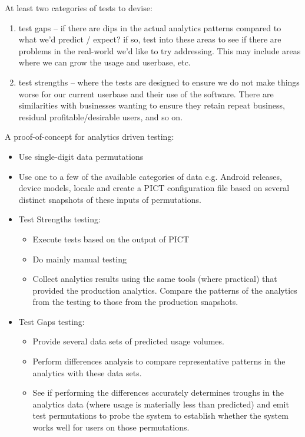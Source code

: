 At least two categories of tests to devise:
\begin{enumerate}
    \item test gaps – if there are dips in the actual analytics patterns compared to what we’d predict / expect? if so, test into these areas to see if there are problems in the real-world we’d like to try addressing. This may include areas where we can grow the usage and userbase, etc.
    \item test strengths – where the tests are designed to ensure we do not make things worse for our current userbase and their use of the software. There are similarities with businesses wanting to ensure they retain repeat business, residual profitable/desirable users, and so on.
\end{enumerate}

A proof-of-concept for analytics driven testing: 


\begin{itemize}
    \item Use single-digit data permutations
    \item Use one to a few of the available categories of data e.g. Android releases, device models, locale and create a PICT configuration file based on several distinct snapshots of these inputs of permutations.
    \item Test Strengths testing:
    \begin{itemize}
        \item Execute tests based on the output of PICT
        \item Do mainly manual testing
        \item Collect analytics results using the same tools (where practical) that provided the production analytics. Compare the patterns of the analytics from the testing to those from the production snapshots.
    \end{itemize}
    \item Test Gaps testing:
    \begin{itemize}
        \item Provide several data sets of predicted usage volumes.
        \item Perform differences analysis to compare representative patterns in the analytics with these data sets.
        \item See if performing the differences accurately determines troughs in the analytics data (where usage is materially less than predicted) and emit test permutations to probe the system to establish whether the system works well for users on those permutations.
    \end{itemize}

\end{itemize}
 


